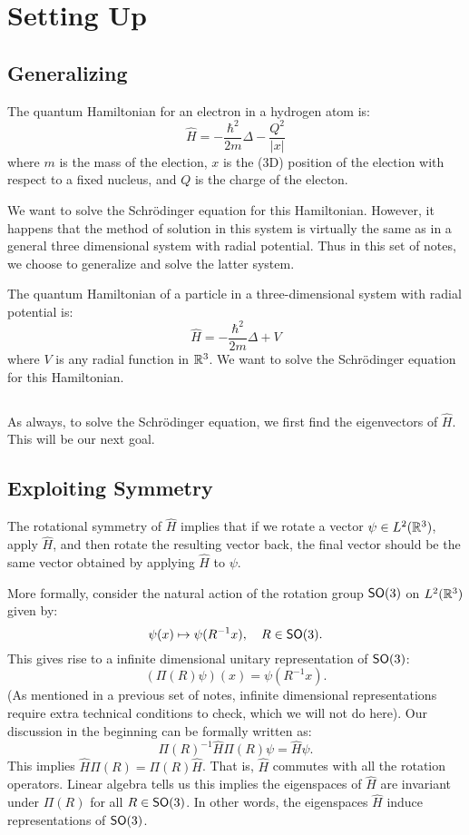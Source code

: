 \section{Setting Up}

\subsection{Generalizing}
The quantum Hamiltonian for an electron in a hydrogen atom is:
\[
    \hat{H} = - \frac{\hbar^2}{2m}\Delta - \frac{Q^2}{|x|}
\]
where $m$ is the mass of the election, $x$ is the (3D) position of the election with respect to a fixed nucleus, and $Q$ is the charge of the electon.

We want to solve the Schr\"{o}dinger equation for this Hamiltonian. However, it happens that the method of solution in this system is virtually the same as in a general three dimensional system with radial potential. Thus in this set of notes, we choose to generalize and solve the latter system.

The quantum Hamiltonian of a particle in a three-dimensional system with radial potential is:
\[
    \hat{H} = - \frac{\hbar^2}{2m}\Delta + V
\]
where $V$ is any radial function in ${\mathbb R}^3$. We want to solve the Schr\"{o}dinger equation for this Hamiltonian.

\subsection{}
As always, to solve the Schr\"{o}dinger equation, we first find the eigenvectors of $\hat{H}$. This will be our next goal.

\subsection{Exploiting Symmetry}
The rotational symmetry of $\hat{H}$ implies that if we rotate a vector $\psi \in L^2({\mathbb R}^3)$, apply $\hat{H}$, and then rotate the resulting vector back, the final vector should be the same vector obtained by applying $\hat{H}$ to $\psi$.

More formally, consider the natural action of the rotation group $\operatorname{\textsf{SO}}(3)$ on $L^2({\mathbb R}^3)$ given by:
\[
    \psi(x) \mapsto \psi(R^{-1}x), \quad R \in \operatorname{\textsf{SO}}(3).
\]
This gives rise to a infinite dimensional unitary representation of $\operatorname{\textsf{SO}}(3)$:
\[
    (\Pi(R)\psi)(x) = \psi(R^{-1}x).
\]
(As mentioned in a previous set of notes, infinite dimensional representations require extra technical conditions to check, which we will not do here). Our discussion in the beginning can be formally written as:
\[
    \Pi(R)^{-1}\hat{H}\Pi(R)\psi = \hat{H}\psi.
\]
This implies $\hat{H}\Pi(R) = \Pi(R)\hat{H}$. That is, $\hat{H}$ commutes with all the rotation operators. Linear algebra tells us this implies the eigenspaces of $\hat{H}$ are invariant under $\Pi(R)$ for all $R \in \operatorname{\textsf{SO}}(3)$. In other words, the eigenspaces $\hat{H}$ induce representations of $\operatorname{\textsf{SO}}(3)$.

